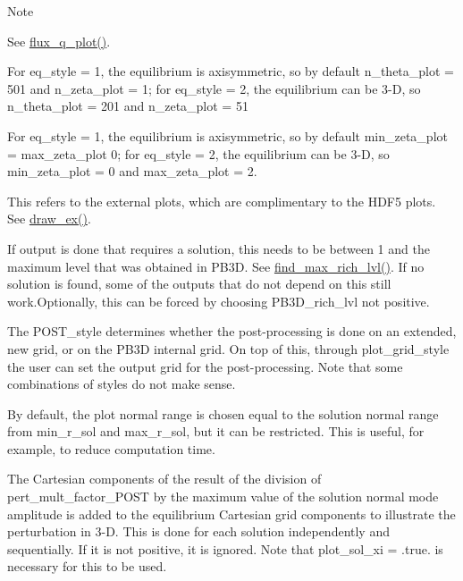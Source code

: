 \begin{DoxyNote}{Note}
\begin{DoxyEnumerate}
See \hyperlink{namespaceeq__ops_abe0074f8c386b52f685352666a822eb8}{flux\+\_\+q\+\_\+plot()}.
\item \label{page_inputs_fni19}%
%
For {\ttfamily eq\+\_\+style = 1}, the equilibrium is axisymmetric, so by default {\ttfamily n\+\_\+theta\+\_\+plot = 501} and {\ttfamily n\+\_\+zeta\+\_\+plot = 1}; for {\ttfamily eq\+\_\+style = 2}, the equilibrium can be 3-\/D, so {\ttfamily n\+\_\+theta\+\_\+plot = 201} and {\ttfamily n\+\_\+zeta\+\_\+plot = 51}
\item \label{page_inputs_fni20}%
%
For {\ttfamily eq\+\_\+style = 1}, the equilibrium is axisymmetric, so by default {\ttfamily min\+\_\+zeta\+\_\+plot = max\+\_\+zeta\+\_\+plot 0}; for {\ttfamily eq\+\_\+style = 2}, the equilibrium can be 3-\/D, so {\ttfamily min\+\_\+zeta\+\_\+plot = 0} and {\ttfamily max\+\_\+zeta\+\_\+plot = 2}.
\item \label{page_inputs_fni21}%
%
This refers to the external plots, which are complimentary to the H\+D\+F5 plots. See \hyperlink{namespaceoutput__ops_a50bfbb88cc91805469353c3ff47b3e2e}{draw\+\_\+ex()}.
\item \label{page_inputs_fni22}%
%
If output is done that requires a solution, this needs to be between 1 and the maximum level that was obtained in P\+B3D. See \hyperlink{namespacerich__ops_a58e1bed1bed5c2d0b91cc7dc5e3099d9}{find\+\_\+max\+\_\+rich\+\_\+lvl()}. If no solution is found, some of the outputs that do not depend on this still work.\+Optionally, this can be forced by choosing {\ttfamily P\+B3\+D\+\_\+rich\+\_\+lvl} not positive.
\item \label{page_inputs_fni23}%
%
The {\ttfamily P\+O\+S\+T\+\_\+style} determines whether the post-\/processing is done on an extended, new grid, or on the P\+B3D internal grid. On top of this, through {\ttfamily plot\+\_\+grid\+\_\+style} the user can set the output grid for the post-\/processing. Note that some combinations of styles do not make sense.
\item \label{page_inputs_fni24}%
%
By default, the plot normal range is chosen equal to the solution normal range from {\ttfamily min\+\_\+r\+\_\+sol} and {\ttfamily max\+\_\+r\+\_\+sol}, but it can be restricted. This is useful, for example, to reduce computation time.
\item \label{page_inputs_fni25}%
%
The Cartesian components of the result of the division of {\ttfamily pert\+\_\+mult\+\_\+factor\+\_\+\+P\+O\+ST} by the maximum value of the solution normal mode amplitude is added to the equilibrium Cartesian grid components to illustrate the perturbation in 3-\/D. This is done for each solution independently and sequentially. If it is not positive, it is ignored. Note that {\ttfamily plot\+\_\+sol\+\_\+xi = .true.} is necessary for this to be used.

\end{DoxyEnumerate}
\end{DoxyNote}
